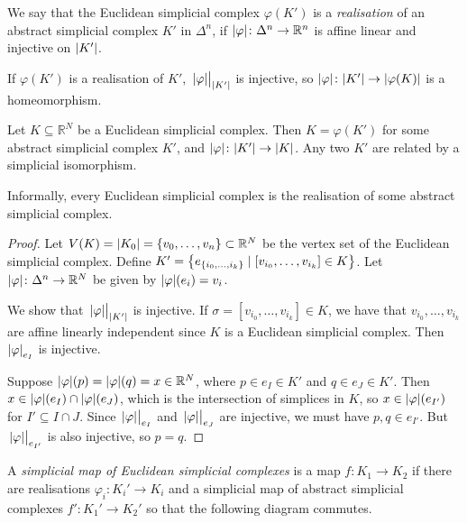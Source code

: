 \begin{definition}
	We say that the Euclidean simplicial complex \( \varphi(K') \) is a \emph{realisation} of an abstract simplicial complex \( K' \) in \( \Delta^n \), if \( \abs{\varphi} \colon \Delta^n \to \mathbb R^n \) is affine linear and injective on \( \abs{K'} \).
\end{definition}
\begin{remark}
	If \( \varphi(K') \) is a realisation of \( K' \), \( \eval{\abs{\varphi}}_{\abs{K'}} \) is injective, so \( \abs{\varphi} \colon \abs{K'} \to \abs{\varphi(K)} \) is a homeomorphism.
\end{remark}
\begin{proposition}
	Let \( K \subseteq \mathbb R^N \) be a Euclidean simplicial complex.
	Then \( K = \varphi(K') \) for some abstract simplicial complex \( K' \), and \( \abs{\varphi} \colon \abs{K'} \to \abs{K} \).
	Any two \( K' \) are related by a simplicial isomorphism.
\end{proposition}
Informally, every Euclidean simplicial complex is the realisation of some abstract simplicial complex.
\begin{proof}
	Let \( V(K) = \abs{K_0} = \qty{v_0, \dots, v_n} \subset \mathbb R^N \) be the vertex set of the Euclidean simplicial complex.
	Define \( K' = \qty{e_{\qty{i_0, \dots, i_k}} \mid [v_{i_0}, \dots, v_{i_k}] \in K} \).
	Let \( \abs{\varphi} \colon \Delta^n \to \mathbb R^N \) be given by \( \abs{\varphi}(e_i) = v_i \).

	We show that \( \eval{\abs{\varphi}}_{\abs{K'}} \) is injective.
	If \( \sigma = [v_{i_0}, \dots, v_{i_k}] \in K \), we have that \( v_{i_0}, \dots, v_{i_k} \) are affine linearly independent since \( K \) is a Euclidean simplicial complex.
	Then \( \abs{\varphi}_{e_I} \) is injective.

	Suppose \( \abs{\varphi}(p) = \abs{\varphi}(q) = x \in \mathbb R^N \), where \( p \in e_I \in K' \) and \( q \in e_J \in K' \).
	Then \( x \in \abs{\varphi}(e_I) \cap \abs{\varphi}(e_J) \), which is the intersection of simplices in \( K \), so \( x \in \abs{\varphi}(e_{I'}) \) for \( I' \subseteq I \cap J \).
	Since \( \eval{\abs{\varphi}}_{e_I} \) and \( \eval{\abs{\varphi}}_{e_J} \) are injective, we must have \( p, q \in e_{I'} \).
	But \( \eval{\abs{\varphi}}_{e_{I'}} \) is also injective, so \( p = q \).
\end{proof}
\begin{definition}
	A \emph{simplicial map of Euclidean simplicial complexes} is a map \( f \colon K_1 \to K_2 \) if there are realisations \( \varphi_i \colon K_i' \to K_i \) and a simplicial map of abstract simplicial complexes \( f' \colon K_1' \to K_2' \) so that the following diagram commutes.
	\begin{center}
	\end{center}
\end{definition}
